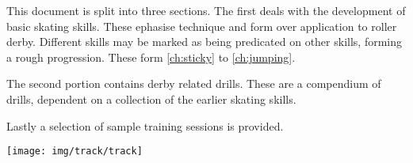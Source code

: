 This document is split into three sections. The first deals with the development of basic skating skills.  
These ephasise technique and form over application to roller derby.
Different skills may be marked as being predicated on other skills, forming a rough progression. 
These form \cref{ch:sticky} to \cref{ch:jumping}. 


The second portion contains derby related drills.
These are a compendium of drills, dependent on a collection of the earlier skating skills. 


Lastly a selection of sample training sessions is provided. 

\vspace{2cm}

\begin{center}
\texttt{[image: img/track/track]}
\end{center}
